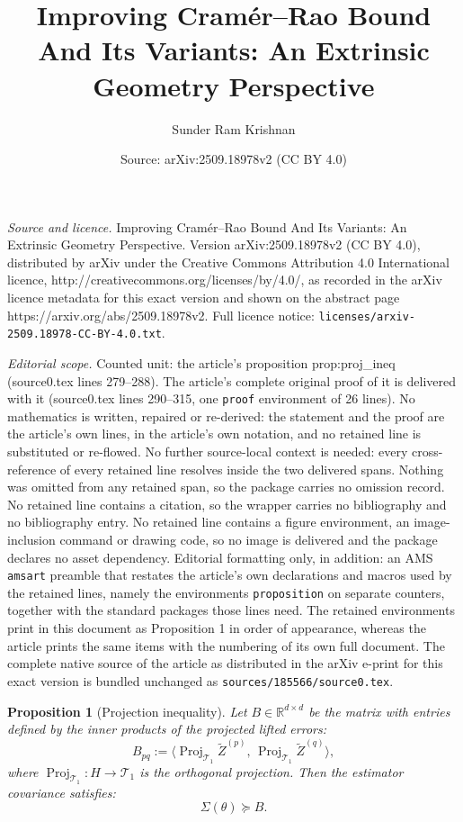 \documentclass[10pt,a4paper]{amsart}
\title{Improving Cramér--Rao Bound And Its Variants: An Extrinsic Geometry Perspective}
\author{Sunder Ram Krishnan}
\date{Source: arXiv:2509.18978v2 (CC BY 4.0)}
\newtheorem{proposition}{Proposition}
\begin{document}
\maketitle

\noindent\emph{Source and licence.} Improving Cramér--Rao Bound And Its Variants: An Extrinsic Geometry Perspective. Version arXiv:2509.18978v2 (CC BY 4.0), distributed by arXiv under the Creative Commons Attribution 4.0 International licence, http://creativecommons.org/licenses/by/4.0/, as recorded in the arXiv licence metadata for this exact version and shown on the abstract page https://arxiv.org/abs/2509.18978v2. Full licence notice: \texttt{licenses/arxiv-2509.18978-CC-BY-4.0.txt}.\par\smallskip

\noindent\textit{Editorial scope.} Counted unit: the article's proposition prop:proj\_ineq (source0.tex lines 279--288). The article's complete original proof of it is delivered with it (source0.tex lines 290--315, one \texttt{proof} environment of 26 lines). No mathematics is written, repaired or re-derived: the statement and the proof are the article's own lines, in the article's own notation, and no retained line is substituted or re-flowed.  No further source-local context is needed: every cross-reference of every retained line resolves inside the two delivered spans.  Nothing was omitted from any retained span, so the package carries no omission record.  No retained line contains a citation, so the wrapper carries no bibliography and no bibliography entry.  No retained line contains a figure environment, an image-inclusion command or drawing code, so no image is delivered and the package declares no asset dependency.  Editorial formatting only, in addition: an AMS \texttt{amsart} preamble that restates the article's own declarations and macros used by the retained lines, namely the environments \texttt{proposition} on separate counters, together with the standard packages those lines need.  The retained environments print in this document as Proposition 1 in order of appearance, whereas the article prints the same items with the numbering of its own full document.  The complete native source of the article as distributed in the arXiv e-print for this exact version is bundled unchanged as \texttt{sources/185566/source0.tex}.
\begin{proposition}[Projection inequality]\label{prop:proj_ineq}
Let \(B\in\mathbb{R}^{d\times d}\) be the matrix with entries defined by the inner products of the projected lifted errors:
\[
B_{pq} := \big\langle \operatorname{Proj}_{\mathcal{T}_1}\widetilde Z^{(p)},\, \operatorname{Proj}_{\mathcal{T}_1}\widetilde Z^{(q)}\big\rangle,
\]
where \(\operatorname{Proj}_{\mathcal{T}_1}:H\to \mathcal{T}_1\) is the orthogonal projection. Then the estimator covariance satisfies:
\[
\Sigma(\theta) \succeq B.
\]
\end{proposition}
\end{document}
